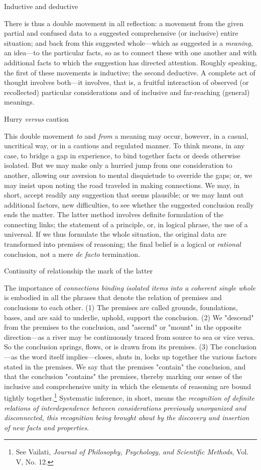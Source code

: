 \documentclass[letterpaper]{book}
\begin{document}
Inductive and deductive

There is thus a double movement in all reflection: a movement from the
given partial and confused data to a suggested comprehensive (or
inclusive) entire situation; and back from this suggested whole---which
as suggested is a \emph{meaning}, an idea---to the particular facts, so
as to connect these with one another and with additional facts to which
the suggestion has directed attention. Roughly speaking, the first of
these
movements
is inductive; the second deductive. A complete act of thought involves
both---it involves, that is, a fruitful interaction of observed (or
recollected) particular considerations and of inclusive and far-reaching
(general) meanings.

Hurry \emph{versus} caution

This double movement \emph{to} and \emph{from} a meaning may occur,
however, in a casual, uncritical way, or in a cautious and regulated
manner. To think means, in any case, to bridge a gap in experience, to
bind together facts or deeds otherwise isolated. But we may make only a
hurried jump from one consideration to another, allowing our aversion to
mental disquietude to override the gaps; or, we may insist upon noting
the road traveled in making connections. We may, in short, accept
readily any suggestion that seems plausible; or we may hunt out
additional factors, new difficulties, to see whether the suggested
conclusion really ends the matter. The latter method involves definite
formulation of the connecting links; the statement of a principle, or,
in logical phrase, the use of a universal. If we thus formulate the
whole situation, the original data are transformed into premises of
reasoning; the final belief is a logical or \emph{rational} conclusion,
not a mere \emph{de facto} termination.

Continuity of relationship the mark of the latter

The importance of \emph{connections binding isolated items into a
coherent single whole} is embodied in all the phrases that denote the
relation of premises and conclusions to each other. (1) The premises are
called grounds, foundations, bases, and are said to underlie, uphold,
support the conclusion. (2) We "descend" from the premises to the
conclusion, and "ascend" or "mount" in the opposite direction---as a
river may be continuously traced from source to sea or vice versa. So
the conclusion springs, flows, or is drawn from its
premises.
(3) The conclusion---as the word itself implies---closes, shuts in,
locks up together the various factors stated in the premises. We say
that the premises "contain" the conclusion, and that the conclusion
"contains" the premises, thereby marking our sense of the inclusive and
comprehensive unity in which the elements of reasoning are bound tightly
together.\footnote{
See Vailati, \emph{Journal of Philosophy, Psychology, and Scientific
Methods}, Vol. V, No. 12.
}
Systematic inference, in short, means the \emph{recognition of definite
relations of interdependence between considerations previously
unorganized and disconnected, this recognition being brought about by
the discovery and insertion of new facts and properties}.
\end{document}
